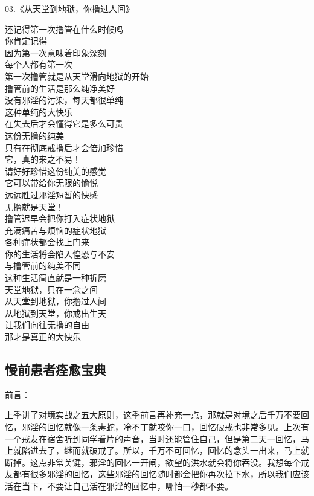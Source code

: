 \documentclass{ctexart}
\begin{document}
\begin{center}
    03.《从天堂到地狱，你撸过人间》\it
    \begin{multicols}{2}
        还记得第一次撸管在什么时候吗 \\ 你肯定记得 \\ 因为第一次意味着印象深刻 \\ 每个人都有第一次 \\ 第一次撸管就是从天堂滑向地狱的开始 \\ 撸管前的生活是那么纯净美好 \\ 没有邪淫的污染，每天都很单纯 \\ 这种单纯的大快乐 \\ 在失去后才会懂得它是多么可贵 \\ 这份无撸的纯美 \\ 只有在彻底戒撸后才会倍加珍惜 \\ 它，真的来之不易！ \\ 请好好珍惜这份纯美的感觉 \\ 它可以带给你无限的愉悦 \\ 远远胜过邪淫短暂的快感 \\ 无撸就是天堂！ \\ 撸管迟早会把你打入症状地狱 \\ 充满痛苦与烦恼的症状地狱 \\ 各种症状都会找上门来 \\ 你的生活将会陷入惶恐与不安 \\ 与撸管前的纯美不同 \\ 这种生活简直就是一种折磨 \\ 天堂地狱，只在一念之间 \\ 从天堂到地狱，你撸过人间 \\ 从地狱到天堂，你戒出生天 \\ 让我们向往无撸的自由 \\ 那才是真正的大快乐
    \end{multicols}
\end{center}

\subsection{慢前患者痊愈宝典}

前言：

上季讲了对境实战之五大原则，这季前言再补充一点，那就是对境之后千万不要回忆，邪淫的回忆就像一条毒蛇，冷不丁就咬你一口，回忆破戒也非常多见。上次有一个戒友在宿舍听到同学看片的声音，当时还能管住自己，但是第二天一回忆，马上就陷进去了，继而就破戒了。所以，千万不可回忆，回忆的念头一出来，马上就断掉。这点非常关键，邪淫的回忆一开闸，欲望的洪水就会将你吞没。我想每个戒友都有很多邪淫的回忆，这些邪淫的回忆随时都会把你再次拉下水，所以我们应该活在当下，不要让自己活在邪淫的回忆中，哪怕一秒都不要。
\end{document}
